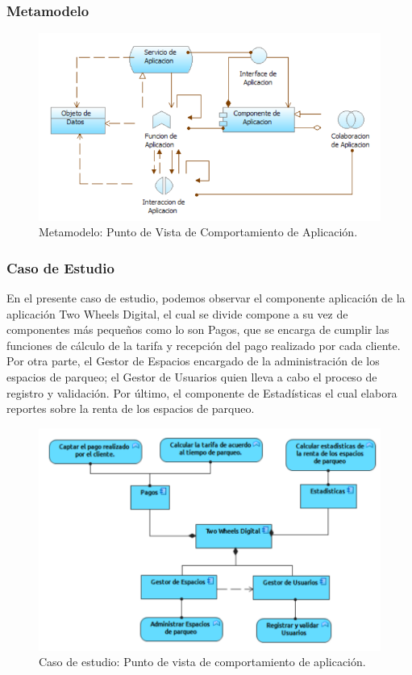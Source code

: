 \subsubsection{Metamodelo}
\begin{figure}[H]
	\centering
	\includegraphics[width=1.0\textwidth]{imagenes/Metamodelos/Aplicacion/meta_comportamiento_aplicacion.png}
	\caption{Metamodelo: Punto de Vista de Comportamiento de Aplicación.}
	\label{fig:gap_analysis}
\end{figure}

\subsubsection{Caso de Estudio}
En el presente caso de estudio, podemos observar el componente aplicación de la aplicación Two Wheels Digital, el cual se divide compone a su vez de componentes más pequeños como lo son Pagos, que se encarga de cumplir las funciones de cálculo de la tarifa y recepción del pago realizado por cada cliente. Por otra parte, el Gestor de Espacios encargado de la administración de los espacios de parqueo; el Gestor de Usuarios quien lleva a cabo el proceso de registro y validación. Por último, el componente de Estadísticas el cual elabora reportes sobre la renta de los espacios de parqueo.
\begin{figure}[H]
	\centering
	\includegraphics[width=1.0\textwidth]{imagenes/Caso_Estudio/Aplicacion/ComAplicacion.PDF}
	\caption{Caso de estudio: Punto de vista de comportamiento de aplicación.}
	\label{fig:gap_analysis}
\end{figure}




